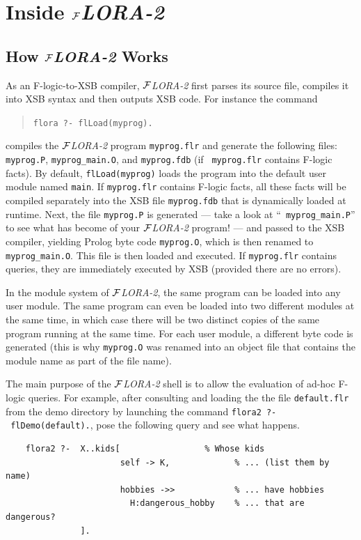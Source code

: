 \documentclass[11pt]{article}
\newcommand{\FLORA}{{\mbox{${\cal F}${\small\it LORA}\rm\emph{-2}}}\xspace}
\newcommand{\fl}{\mbox{F-logic}\xspace}
\begin{document}
\section{Inside \FLORA}

\subsection{How \FLORA Works}


As an \fl-to-XSB compiler, \FLORA first parses its source file,
compiles it into XSB syntax and then outputs XSB code. For instance the command
\begin{quote}
\verb|flora ?- flLoad(myprog).|
\end{quote}
compiles the \FLORA program {\tt myprog.flr} and generate the following
files: {\tt myprog.P}, {\tt myprog\_main.O}, and {\tt myprog.fdb} (if {\tt
  myprog.flr} contains \fl facts).  By default, {\tt flLoad(myprog)} loads
the program into the default user module named {\tt main}. If {\tt myprog.flr}
contains \fl facts, all these facts will be compiled separately into the
XSB file {\tt myprog.fdb} that is dynamically loaded at runtime.  Next, the
file {\tt myprog.P} is generated --- take a look at ``{\tt
  myprog\_main.P}'' to see what has become of your \FLORA program! --- and
passed to the XSB compiler, yielding Prolog byte code {\tt myprog.O}, which
is then renamed to {\tt myprog\_main.O}. This file is then loaded and
executed.  If {\tt myprog.flr} contains queries, they are immediately
executed by XSB (provided there are no errors).

In the module system of \FLORA, the same program can be loaded into any
user module. The same program can even be loaded into two different
modules at the same time, in which case there will be two distinct copies
of the same program running at the same time. For each user module, a different
byte code is generated (this is why {\tt myprog.O} was renamed into an
object file that contains the module name as part of the file name).

The main purpose of the \FLORA shell is to allow the evaluation
of ad-hoc \fl queries. For example, after consulting and loading the
the file \texttt{default.flr} from the demo directory by launching
the command \texttt{flora2~?-~flDemo(default).}, pose the following query
and see what happens.
\begin{verbatim}
    flora2 ?-  X..kids[                 % Whose kids
                       self -> K,             % ... (list them by name)
                       hobbies ->>            % ... have hobbies
                         H:dangerous_hobby    % ... that are dangerous?
               ]. 
\end{verbatim}
\end{document}
